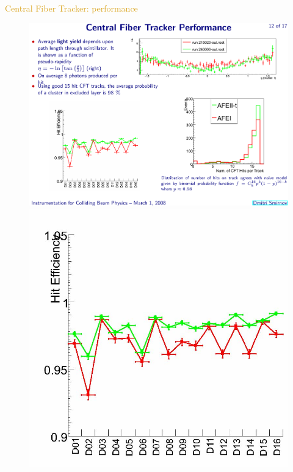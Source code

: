 \begin{frame}{\textcolor{Goldenrod}{Central Fiber Tracker: performance}}
  \begin{overlayarea}{\textwidth}{\textheight}
    \begin{figure}[h]\centering
      \includegraphics[height=0.2\textheight]{./Images/22_CFT_performance.pdf}\\
      \includegraphics[height=0.3\textheight]{./Images/23_CFT_performance}

\end{figure}
\end{overlayarea}
\end{frame}
